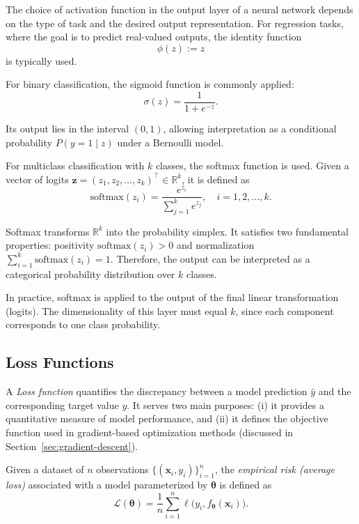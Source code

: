 The choice of activation function in the output layer of a neural network depends on the type of task and the desired output representation. For regression tasks, where the goal is to predict real-valued outputs, the identity function
\begin{equation*}
\phi(z) := z
\end{equation*}
is typically used.

For binary classification, the sigmoid function is commonly applied:
\begin{equation*}
\sigma(z) = \frac{1}{1 + e^{-z}}.
\end{equation*}

Its output lies in the interval $(0,1)$, allowing interpretation as a conditional probability $P(y=1 \mid z)$ under a Bernoulli model.

For multiclass classification with $k$ classes, the softmax function is used. Given a vector of logits $\mathbf{z} = (z_1, z_2, \dots, z_k)^\top \in \mathbb{R}^k$, it is defined as
\begin{equation*}
\mathrm{softmax}(z_i) = \frac{e^{z_i}}{\sum_{j=1}^{k} e^{z_j}}, \quad i = 1,2, \dots, k.
\end{equation*}

Softmax transforms $\mathbb{R}^k$ into the probability simplex. It satisfies two fundamental properties: positivity $\mathrm{softmax}(z_i) > 0$ and normalization $\sum_{i=1}^{k} \mathrm{softmax}(z_i)=1$. Therefore, the output can be interpreted as a categorical probability distribution over $k$ classes.

In practice, softmax is applied to the output of the final linear transformation (logits). The dimensionality of this layer must equal $k$, since each component corresponds to one class probability.

\subsection{Loss Functions}
\label{sec:loss-functions}
A \emph{Loss function} quantifies the discrepancy between a model prediction $\hat{y}$ and the corresponding target value $y$. It serves two main purposes: (i) it provides a quantitative measure of model performance, and (ii) it defines the objective function used in gradient-based optimization methods (discussed in Section~\ref{sec:gradient-descent}).

Given a dataset of $n$ observations $\{(\mathbf{x}_i, y_i)\}_{i=1}^{n}$, the \emph{empirical risk (average loss)} associated with a model parameterized by $\boldsymbol{\theta}$ is defined as
\begin{equation*}
\mathcal{L}(\boldsymbol{\theta}) = \frac{1}{n} \sum_{i=1}^{n} \ell\bigl(y_i, f_{\boldsymbol{\theta}}(\mathbf{x}_i)\bigr).
\end{equation*}

